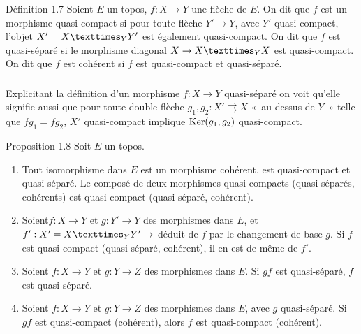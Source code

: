 \documentclass[10pt]{../fichiers-configuration-latex/smfart}
\begin{document}
\begin{enonce*}{Définition 1.7}
Soient $E$ un topos, $f : X \to Y$ une flèche de $E$. On dit que $f$
est un morphisme quasi-compact si pour toute flèche $Y'\to Y$, avec
$Y'$ quasi-compact, l'objet $X'= \fprod{X}{Y'}{Y}$ est également
quasi-compact. On dit que $f$ est quasi-séparé si le morphisme
diagonal $X \to \fprod{X}{X}{Y}$ est quasi-compact. On dit que $f$ est
cohérent si $f$ est quasi-compact et quasi-séparé.
\end{enonce*}

\setcounter{subsection}{7}
\setcounter{subsubsection}{0}
\subsubsection{}
Explicitant la définition d'un morphisme $f : X \to Y$ quasi-séparé on
voit qu'elle signifie aussi que pour toute double flèche $g_1, g_2 :
X'\rightrightarrows X$ « au-dessus de $Y$ » \ie telle que $fg_1 =
fg_2$, $X'$ quasi-compact implique $\operatorname{Ker}(g_1, g_2)$ quasi-compact.

\begin{enonce*}{Proposition 1.8}
Soit $E$ un topos.
\begin{enumerate}
\renewcommand{\theenumi}{\roman{enumi}}
\renewcommand{\labelenumi}{(\theenumi)}
\item Tout isomorphisme dans $E$ est un morphisme cohérent, \ie est
  quasi-compact et quasi-séparé. Le composé de deux morphismes
  quasi-compacts (\resp quasi-séparés, \resp cohérents) est
  quasi-compact (\resp quasi-séparé, \resp cohérent).

\item Soient\pageoriginale $f : X \to Y$ et $g : Y' \to Y$ des
  morphismes dans $E$,   et $f': X'= \fprod{X}{Y'}{Y} \to$ déduit de $f$ par le changement de
  base $g$. Si $f$ est quasi-compact (\resp quasi-séparé, \resp
  cohérent), il en est de même de $f'$.

\item Soient $f : X \to Y$ et $g : Y \to Z$ des
  morphismes dans $E$. Si $gf$ est quasi-séparé, $f$ est quasi-séparé.

\item Soient $f : X \to Y$ et $g : Y \to Z$ des morphismes dans $E$,
  avec $g$ quasi-séparé. Si $gf$ est quasi-compact (\resp cohérent),
  alors $f$ est quasi-compact (\resp cohérent).
\end{enumerate}
\end{enonce*}
\end{document}
